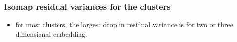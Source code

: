 \documentclass[svgnames, table, smaller]{beamer}
\begin{document}
\begin{frame}
  \frametitle{Isomap residual variances for the clusters}
  
  \begin{itemize}
  \item for most clusters, the largest drop in residual variance is for 
    two or three dimensional embedding.
  \end{itemize}

  \begin{figure}[ht]
    \begin{center}
      \label{gtvrvs}
    \end{center}
  \end{figure}



\end{frame}


\end{document}
